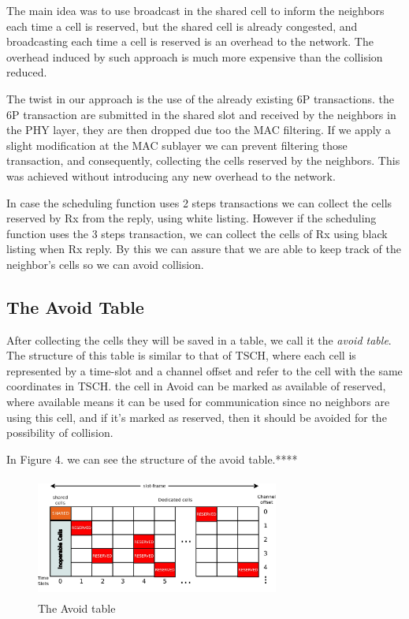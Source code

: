 \documentclass[10pt, conference, compsocconf]{IEEEtran}
\begin{document}
The main idea was to use broadcast in the shared cell to inform the neighbors each time a cell is reserved, but the shared cell is already congested, and broadcasting each time a cell is reserved is an overhead to the network. The overhead induced by such approach is much more expensive than the collision reduced. 

The twist in our approach is the use of the already existing 6P transactions. the 6P transaction are submitted in the shared slot and received by the neighbors in the PHY layer, they are then dropped due too the MAC filtering. If we apply a slight modification at the MAC sublayer we can prevent filtering those transaction, and consequently, collecting the cells reserved by the neighbors. This was achieved without introducing any new overhead to the network. 

In case the scheduling function uses 2 steps transactions we can collect the cells reserved by Rx from the reply, using white listing. However if the scheduling function uses the 3 steps transaction, we can collect the cells of Rx using black listing when Rx reply. By this we can assure that we are able to keep track of the neighbor's cells so we can avoid collision. 
\subsection{The Avoid Table}

After collecting the cells they will be saved in a table, we call it the {\em avoid table}. The structure of this table is similar to that of TSCH, where each cell is represented by a time-slot and a channel offset and refer to the cell with the same coordinates in TSCH. the cell in Avoid can be marked as available of reserved, where available means it can be used for communication since no neighbors are using this cell, and if it's marked as reserved, then it should be avoided for the possibility of collision.

In Figure 4. we can see the structure of the avoid table.****


 
\begin{figure}[h]
    \centering
    \includegraphics[width=8cm, height=4cm]{avoid.jpeg}
    \caption{The Avoid table}
    \label{fig:Collision in 6TiSCH Networks}
\end{figure}
\end{document}
